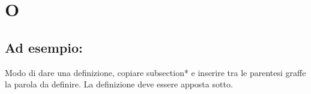 \section*{O}
\markright{}
\subsection*{Ad esempio:}
Modo di dare una definizione, copiare subsection*{} e inserire tra le parentesi graffe la parola da definire. La definizione deve essere apposta sotto.